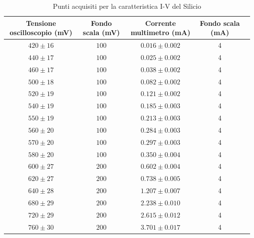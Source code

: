 \documentclass[]{article}
\begin{document}
	\begin{table}[H]
		\centering
	\begin{tabular}{|c|c|c|c|c|}
		\hline
		Tensione oscilloscopio (mV)& Fondo scala (mV) & Corrente multimetro (mA) &Fondo scala (mA)\\
		\hline
		$ 420\pm 16 $ &$ 100 $ & $ 0.016\pm 0.002 $ &4\\
		\hline
		$440\pm17 $ &$ 100 $ & $ 0.025\pm0.002 $ &4 \\
		\hline
		$ 460\pm 17 $ &$ 100 $ & $ 0.038\pm 0.002 $ &4 \\
		\hline
		$ 500\pm 18 $ &$ 100 $ & $ 0.082\pm 0.002 $ &4 \\
		\hline
		$ 520\pm 19 $ &$ 100 $ & $0.121\pm 0.002$ &4 \\
		\hline
		$ 540\pm 19 $ &$ 100 $ & $ 0.185\pm 0.003 $ &4 \\
		\hline
		$ 550\pm 19 $ &$ 100 $ & $ 0.213\pm 0.003 $ &4 \\
		\hline
		$ 560\pm 20 $ &$ 100 $ & $ 0.284\pm 0.003 $ &4 \\
		\hline
		$ 570\pm 20 $ &$ 100 $ & $ 0.297\pm 0.003 $ &4 \\
		\hline
		$ 580\pm 20 $ &$ 100 $ & $ 0.350\pm 0.004 $ &4 \\
		\hline
		$ 600\pm 27 $ &$ 200 $ & $ 0.602\pm0.004 $  &4\\
		\hline
		$ 620\pm 27 $ &$ 200 $ & $ 0.738\pm0.005 $  &4\\
		\hline
		$ 640\pm 28 $ &$ 200 $ & $ 1.207\pm0.007 $  &4\\
		\hline
		$ 680\pm 29 $ &$ 200 $ & $ 2.238\pm 0.010 $ &4 \\
		\hline
		$ 720\pm 29 $ &$ 200 $ & $ 2.615\pm 0.012 $ &4 \\
		\hline
		$ 760\pm 30 $ &$ 200 $ & $ 3.701\pm 0.017 $ &4 \\
		\hline
			\end{tabular}
		\caption{Punti acquisiti per la caratteristica I-V del Silicio}
		\label{tab:silicio}
	\end{table}
\end{document}
